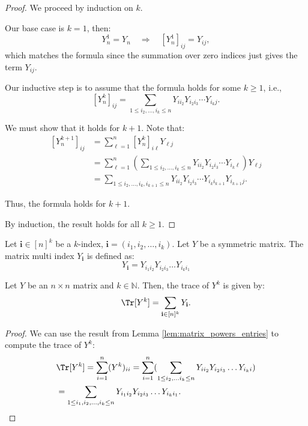 \begin{proof}
  We proceed by induction on $k$.

  Our base case is $k=1$, then:
  $$
  Y_n^1 = Y_n \quad \Rightarrow \quad [Y_n^1]_{ij} = Y_{ij},
  $$
  which matches the formula since the summation over zero indices just gives the term $Y_{ij}$.

  Our inductive step is to assume that the formula holds for some $k \ge 1$, i.e.,
  $$
  \left[Y_n^k\right]_{ij} = \sum_{1 \le i_2, \dots, i_k \le n} Y_{i i_2} Y_{i_2 i_3} \cdots Y_{i_k j}.
  $$

  We must show that it holds for $k + 1$. Note that:
  \begin{align*}
  \left[Y_n^{k+1}\right]_{ij}
  &= \sum_{\ell = 1}^n \left[Y_n^k\right]_{i\ell} Y_{\ell j} \\
  &= \sum_{\ell = 1}^n \left( \sum_{1 \le i_2, \dots, i_k \le n} Y_{i i_2} Y_{i_2 i_3} \cdots Y_{i_k \ell} \right) Y_{\ell j} \\
  &= \sum_{1 \le i_2, \dots, i_k, i_{k+1} \le n} Y_{i i_2} Y_{i_2 i_3} \cdots Y_{i_k i_{k+1}} Y_{i_{k+1} j}.
  \end{align*}

  Thus, the formula holds for $k + 1$.

  By induction, the result holds for all $k \ge 1$.
\end{proof}



\begin{definition}
    \label{def:matrix_multi_index}
    Let $\mathbf{i} \in[n]^k$ be a $k$-index, $\mathbf{i}=\left(i_1, i_2, \ldots, i_k\right)$.
    Let $Y$ be a symmetric matrix. The matrix multi index $Y_{\mathbf{i}}$ is defined as:
    $$
    Y_{\mathbf{i}} = Y_{i_{1}i_{2}} Y_{i_{2}i_{3}} \ldots Y_{i_{k}i_{1}}
    $$
\end{definition}

\begin{lemma}
  \label{lem:matrix_powers_trace}
  Let $Y$ be an $n\times n$ matrix and $k \in \mathbb{N}$. Then, the trace of $Y^{k}$ is given by:
  $$
  \Tr[Y^{k}] = \sum_{\mathbf{i} \in [n]^k} Y_{\mathbf{i}}.
  $$
\end{lemma}

\begin{proof}
  We can use the result from Lemma \ref{lem:matrix_powers_entries} to compute the trace of $Y^k$:
  \begin{align*}
  &\Tr[Y^{k}] = \sum_{i=1}^{n} (Y^{k})_{ii} = \sum_{i=1}^{n} (\sum_{1\leq i_{2}, \ldots i_{k} \leq n} Y_{i i_{2}} Y_{i_{2}i_{3}} \ldots Y_{i_{k} i}) \\
  &= \sum_{1\leq i_{1}, i_{2}, \ldots, i_{k} \leq n} Y_{i_{1} i_{2}} Y_{i_{2} i_{3}} \ldots Y_{i_{k} i_{1}}.
\end{align*}

\end{proof}


